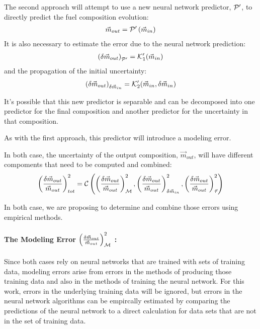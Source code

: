 \documentclass[dvips,12pt]{article}
\newcommand{\unc}[1]
{ \delta #1 }
\newcommand{\uncratio}[1]
{ \left(\frac{\unc{#1}}{#1}\right) }
\newcommand{\uncratiosq}[1]
{ \uncratio{#1}^2 }
\begin{document}
The second approach will attempt to use a new
neural network predictor, ${\cal P^\prime}$, to
directly predict the fuel composition evolution:
\begin{align}
  \vec{m}_{out} = {\cal P^\prime}\left( \vec{m}_{in}\right)
\end{align}
It is also necessary to estimate the error due to
the neural network prediction:
\begin{align}
  \left(\unc{\vec{m}_{out}}\right)_{\cal P^\prime} = {\cal K}_1^{\prime}(\vec{m}_{in})
\end{align}
and the propagation of the initial uncertainty:
\begin{align}
  \left(\unc{\vec{m}_{out}}\right)_{\unc{\vec{m}_{in}}} = {\cal K}^{\prime}_2(\vec{m}_{in}, \unc{\vec{m}_{in}})
\end{align}



It's possible that this new predictor is separable
and can be decomposed into one predictor for the
final composition and another predictor for the
uncertainty in that composition.

As with the first approach, this predictor will
introduce a modeling error.

In both case, the uncertainty of the output
composition, $\vec{m}_{out}$, will have different
compoments that need to be computed and combined:
\begin{align}
  \uncratiosq{\vec{m}_{out}}_{tot} =
  {\cal C}\left(  \uncratiosq{\vec{m}_{out}} _{\cal M},
                  \uncratiosq{\vec{m}_{out}} _{\delta \vec{m}_{in}},
                  \uncratiosq{\vec{m}_{out}} _{\vec{\tau}}
         \right)
\end{align}

In both case, we are proposing to determine and
combine those errors using empirical methods.

\paragraph{The Modeling Error $\uncratiosq{\vec{m}_{out}} _{\cal M}$ : \\}

Since both cases rely on neural networks that are
trained with sets of training data, modeling
errors arise from errors in the methods of
producing those training data and also in the
methods of training the neural network.  For this
work, errors in the underlying training data will
be ignored, but errors in the neural network
algorithms can be empircally estimated by
comparing the predictions of the neural network to
a direct calculation for data sets that are not in
the set of training data.
\end{document}
